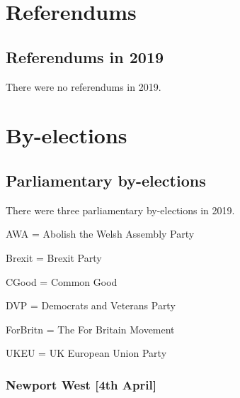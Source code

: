 \documentclass[a4paper,openany]{book}
\begin{document}
 
 



\part{Referendums}

\chapter{Referendums in 2019}

There were no referendums in 2019.

%
%

\part{By-elections}

\chapter{Parliamentary by-elections}

There were three parliamentary by-elections in 2019.

AWA = Abolish the Welsh Assembly Party

Brexit = Brexit Party

CGood = Common Good

DVP = Democrats and Veterans Party

ForBritn = The For Britain Movement

UKEU = UK European Union Party

\section*{Newport West \hspace*{\fill}\nolinebreak[1]%
\enspace\hspace*{\fill}
[4th April]}
\end{document}
